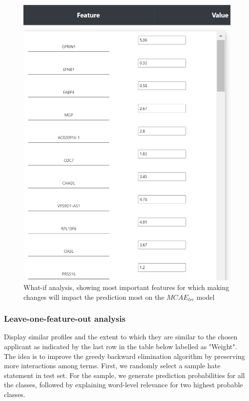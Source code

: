 \begin{figure}[h]
    \centering
	\includegraphics[scale=0.7]{images/what_if.png}
	\caption{What-if analysis, showing most important features for which making changes will impact the prediction most on the $MCAE_{lrc}$ model}
    \label{fig:what_if}
\end{figure}

\subsubsection{Leave-one-feature-out analysis}
Display similar profiles and the extent to which they are similar to the chosen applicant as indicated by the last row in the table below labelled as "Weight". The idea is to improve the greedy backward elimination algorithm by preserving more interactions among terms. First, we randomly select a sample hate statement in test set. For the sample, we generate prediction probabilities for all the classes, followed by explaining word-level relevance for two highest probable classes. 

